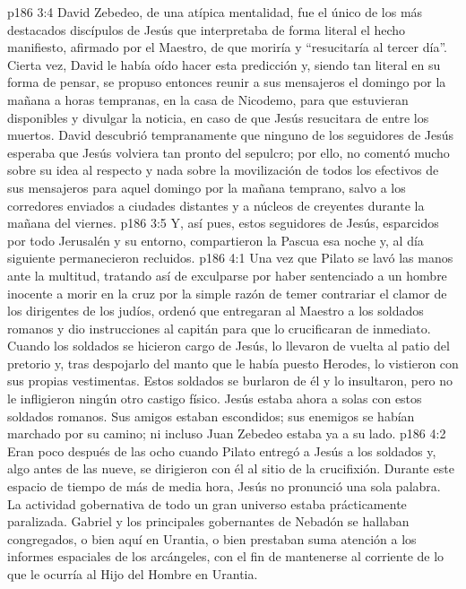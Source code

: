 \vs p186 3:4 David Zebedeo, de una atípica mentalidad, fue el único de los más destacados discípulos de Jesús que interpretaba de forma literal el hecho manifiesto, afirmado por el Maestro, de que moriría y “resucitaría al tercer día”. Cierta vez, David le había oído hacer esta predicción y, siendo tan literal en su forma de pensar, se propuso entonces reunir a sus mensajeros el domingo por la mañana a horas tempranas, en la casa de Nicodemo, para que estuvieran disponibles y divulgar la noticia, en caso de que Jesús resucitara de entre los muertos. David descubrió tempranamente que ninguno de los seguidores de Jesús esperaba que Jesús volviera tan pronto del sepulcro; por ello, no comentó mucho sobre su idea al respecto y nada sobre la movilización de todos los efectivos de sus mensajeros para aquel domingo por la mañana temprano, salvo a los corredores enviados a ciudades distantes y a núcleos de creyentes durante la mañana del viernes.
\vs p186 3:5 Y, así pues, estos seguidores de Jesús, esparcidos por todo Jerusalén y su entorno, compartieron la Pascua esa noche y, al día siguiente permanecieron recluidos.
\vs p186 4:1 Una vez que Pilato se lavó las manos ante la multitud, tratando así de exculparse por haber sentenciado a un hombre inocente a morir en la cruz por la simple razón de temer contrariar el clamor de los dirigentes de los judíos, ordenó que entregaran al Maestro a los soldados romanos y dio instrucciones al capitán para que lo crucificaran de inmediato. Cuando los soldados se hicieron cargo de Jesús, lo llevaron de vuelta al patio del pretorio y, tras despojarlo del manto que le había puesto Herodes, lo vistieron con sus propias vestimentas. Estos soldados se burlaron de él y lo insultaron, pero no le infligieron ningún otro castigo físico. Jesús estaba ahora a solas con estos soldados romanos. Sus amigos estaban escondidos; sus enemigos se habían marchado por su camino; ni incluso Juan Zebedeo estaba ya a su lado.
\vs p186 4:2 Eran poco después de las ocho cuando Pilato entregó a Jesús a los soldados y, algo antes de las nueve, se dirigieron con él al sitio de la crucifixión. Durante este espacio de tiempo de más de media hora, Jesús no pronunció una sola palabra. La actividad gobernativa de todo un gran universo estaba prácticamente paralizada. Gabriel y los principales gobernantes de Nebadón se hallaban congregados, o bien aquí en Urantia, o bien prestaban suma atención a los informes espaciales de los arcángeles, con el fin de mantenerse al corriente de lo que le ocurría al Hijo del Hombre en Urantia.
